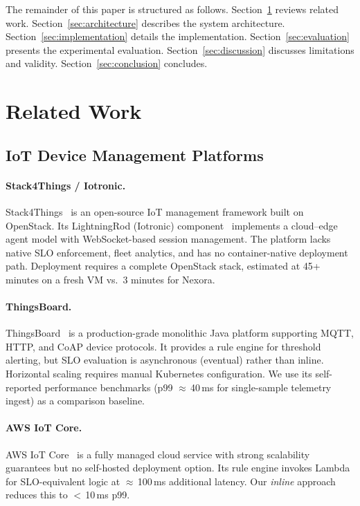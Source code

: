 \documentclass[twocolumn,smallextended]{svjour3}
\begin{document}
The remainder of this paper is structured as follows.
Section~\ref{sec:related} reviews related work.
Section~\ref{sec:architecture} describes the system architecture.
Section~\ref{sec:implementation} details the implementation.
Section~\ref{sec:evaluation} presents the experimental evaluation.
Section~\ref{sec:discussion} discusses limitations and validity.
Section~\ref{sec:conclusion} concludes.

\section{Related Work}
\label{sec:related}

\subsection{IoT Device Management Platforms}

\paragraph{Stack4Things / Iotronic.}
Stack4Things~\cite{ardagna2015stack4things} is an open-source IoT management
framework built on OpenStack. Its LightningRod (Iotronic) component~\cite{longo2019iotronic}
implements a cloud--edge agent model with WebSocket-based session management.
The platform lacks native SLO enforcement, fleet analytics, and has no
container-native deployment path. Deployment requires a complete OpenStack
stack, estimated at 45+ minutes on a fresh VM vs.\ 3 minutes for Nexora.

\paragraph{ThingsBoard.}
ThingsBoard~\cite{thingsboard} is a production-grade monolithic Java platform
supporting MQTT, HTTP, and CoAP device protocols. It provides a rule engine for
threshold alerting, but SLO evaluation is asynchronous (eventual) rather than
inline. Horizontal scaling requires manual Kubernetes configuration.
We use its self-reported performance benchmarks (p99 $\approx$\,40\,ms for
single-sample telemetry ingest) as a comparison baseline.

\paragraph{AWS IoT Core.}
AWS IoT Core~\cite{awsiot} is a fully managed cloud service with strong
scalability guarantees but no self-hosted deployment option. Its rule engine
invokes Lambda for SLO-equivalent logic at $\approx$\,100\,ms additional
latency. Our \emph{inline} approach reduces this to $<$\,10\,ms p99.
\end{document}
